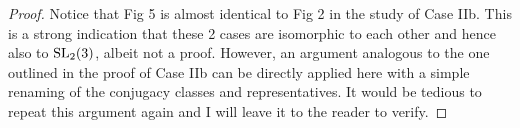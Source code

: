 \begin{proof}









Notice that Fig 5 is almost identical to Fig 2 in the study of Case IIb. This is a strong indication that these 2 cases are isomorphic to each other and hence also to $\operatorname{SL}_2(3)$, albeit not a proof. However, an argument analogous to the one outlined in the proof of Case IIb can be directly applied here with a simple renaming of the conjugacy classes and representatives. It would be tedious to repeat this argument again and I will leave it to the reader to verify.

\end{proof}
